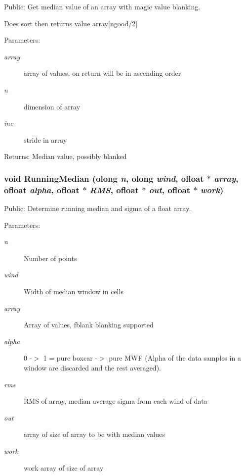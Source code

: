 Public: Get median value of an array with magic value blanking. 

Does sort then returns value array[ngood/2] \begin{Desc}
\item[Parameters:]
\begin{description}
\item[{\em array}]array of values, on return will be in ascending order \item[{\em n}]dimension of array \item[{\em inc}]stride in array \end{description}
\end{Desc}
\begin{Desc}
\item[Returns:]Median value, possibly blanked \end{Desc}
\subsubsection{\setlength{\rightskip}{0pt plus 5cm}void Running\-Median ({\bf olong} {\em n}, {\bf olong} {\em wind}, {\bf ofloat} $\ast$ {\em array}, {\bf ofloat} {\em alpha}, {\bf ofloat} $\ast$ {\em RMS}, {\bf ofloat} $\ast$ {\em out}, {\bf ofloat} $\ast$ {\em work})}\label{ObitUtil_8h_a3}


Public: Determine running median and sigma of a float array. 

\begin{Desc}
\item[Parameters:]
\begin{description}
\item[{\em n}]Number of points \item[{\em wind}]Width of median window in cells \item[{\em array}]Array of values, fblank blanking supported \item[{\em alpha}]0 -$>$ 1 = pure boxcar -$>$ pure MWF (Alpha of the data samples in a window are discarded and the rest averaged). \item[{\em rms}]RMS of array, median average sigma from each wind of data \item[{\em out}]array of size of array to be with median values \item[{\em work}]work array of size of array \end{description}
\end{Desc}
